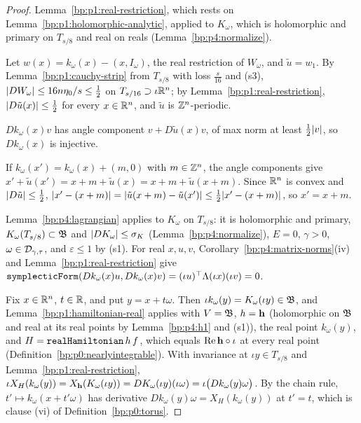 \begin{proof}
\label{step:p4:rt-analytic}
Lemma~\ref{bp:p1:real-restriction}, which rests on Lemma~\ref{bp:p1:holomorphic-analytic}, applied to
$K_\omega$, which is holomorphic and primary on $T_{s/8}$ and real on reals (Lemma~\ref{bp:p4:normalize}).

\label{step:p4:rt-small}
Let $w(x)=k_\omega(x)-(x,I_\omega)$, the real restriction of $W_\omega$, and $\tilde u=w_1$. By
Lemma~\ref{bp:p1:cauchy-strip} from $T_{s/8}$ with loss $\frac s{16}$ and (s3),
$\lvert DW_\omega\rvert\le16n\eta_0/s\le\frac12$ on $T_{s/16}\supset\iota\mathbb{R}^n$; by
Lemma~\ref{bp:p1:real-restriction}, $\lvert D\tilde u(x)\rvert\le\frac12$ for every $x\in\mathbb{R}^n$, and
$\tilde u$ is $\mathbb{Z}^n$-periodic.

\label{step:p4:rt-immersion}
$Dk_\omega(x)v$ has angle component $v+D\tilde u(x)v$, of max norm at least $\frac12\lvert v\rvert$, so
$Dk_\omega(x)$ is injective.

\label{step:p4:rt-embedding}
If $k_\omega(x')=k_\omega(x)+(m,0)$ with $m\in\mathbb{Z}^n$, the angle components give
$x'+\tilde u(x')=x+m+\tilde u(x)=x+m+\tilde u(x+m)$. Since $\mathbb{R}^n$ is convex and
$\lvert D\tilde u\rvert\le\frac12$, $\lvert x'-(x+m)\rvert=\lvert \tilde u(x+m)-\tilde u(x')\rvert\le\frac12\lvert x'-(x+m)\rvert$,
so $x'=x+m$.

\label{step:p4:rt-lagrangian}
Lemma~\ref{bp:p4:lagrangian} applies to $K_\omega$ on $T_{s/8}$: it is holomorphic and primary,
$K_\omega(T_{s/8})\subset\mathfrak{B}$ and $\lvert DK_\omega\rvert\le\sigma_K$ (Lemma~\ref{bp:p4:normalize}),
$E=0$, $\gamma>0$, $\omega\in\mathcal{D}_{\gamma,\tau}$, and $\varepsilon\le1$ by (s1). For real $x,u,v$,
Corollary~\ref{bp:p4:matrix-norms}(iv) and Lemma~\ref{bp:p1:real-restriction} give
$\texttt{symplecticForm}(Dk_\omega(x)u,Dk_\omega(x)v)=(\iota u)^\top\Lambda(\iota x)(\iota v)=0$.

\label{step:p4:rt-ode}
Fix $x\in\mathbb{R}^n$, $t\in\mathbb{R}$, and put $y=x+t\omega$. Then $\iota k_\omega(y)=K_\omega(\iota y)\in\mathfrak{B}$,
and Lemma~\ref{bp:p1:hamiltonian-real} applies with $V=\mathfrak{B}$, $h=\mathbf{h}$ (holomorphic on $\mathfrak{B}$ and real at
its real points by Lemma~\ref{bp:p4:h1} and (s1)), the real point $k_\omega(y)$, and
$H=\texttt{realHamiltonian}\,h\,f$, which equals $\operatorname{Re}\mathbf{h}\circ\iota$ at every real point
(Definition~\ref{bp:p0:nearlyintegrable}). With invariance at $\iota y\in T_{s/8}$ and
Lemma~\ref{bp:p1:real-restriction},
$\iota X_H(k_\omega(y))=X_{\mathbf{h}}(K_\omega(\iota y))=DK_\omega(\iota y)(\iota\omega)=\iota\bigl(Dk_\omega(y)\omega\bigr)$.
By the chain rule, $t'\mapsto k_\omega(x+t'\omega)$ has derivative $Dk_\omega(y)\omega=X_H(k_\omega(y))$
at $t'=t$, which is clause (vi) of Definition~\ref{bp:p0:torus}.


\end{proof}
